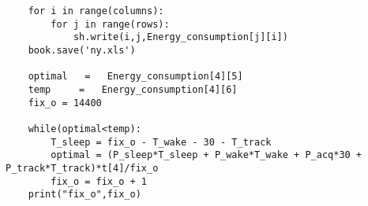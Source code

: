 \begin{appendices}
\begin{lstlisting}
    for i in range(columns):
        for j in range(rows):
            sh.write(i,j,Energy_consumption[j][i])
    book.save('ny.xls')

    optimal   =   Energy_consumption[4][5]
    temp     =   Energy_consumption[4][6]
    fix_o = 14400

    while(optimal<temp):  
        T_sleep = fix_o - T_wake - 30 - T_track
        optimal = (P_sleep*T_sleep + P_wake*T_wake + P_acq*30 + P_track*T_track)*t[4]/fix_o
        fix_o = fix_o + 1
    print("fix_o",fix_o)


\end{lstlisting}
\label{Appendix:make_energy_model.py}
\end{appendices}